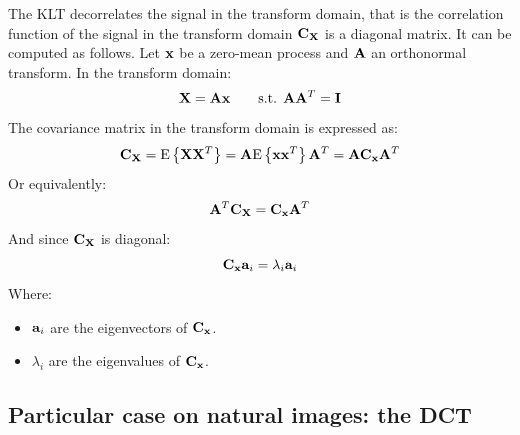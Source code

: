\documentclass[11pt,a4paper,openright,twoside]{book}
\numberwithin{equation}{section} %
\numberwithin{figure}{section} %
\numberwithin{table}{section} %
\begin{document}
The \ac{KLT} decorrelates the signal in the transform domain, that is the
correlation function of the signal in the transform domain $\mathbf{C}_{\mathbf{X}}$ is a
diagonal matrix.
It can be computed as follows.
Let $\mathbf{x}$ be a zero-mean process and $\mathbf{A}$ an orthonormal transform.
In the transform domain:
\begin{equation}
	\mathbf{X} = \mathbf{A} \mathbf{x} \qquad \text{s.t. } \mathbf{A} \mathbf{A}^T = \mathbf{I}
\end{equation}
The covariance matrix in the transform domain is expressed as:
\begin{equation}
	\mathbf{C}_{\mathbf{X}} = \text{E}\left\{\mathbf{X} \mathbf{X}^T\right\} = \mathbf{A} \text{E}\left\{\mathbf{x}\mathbf{x}^T\right\}\mathbf{A}^T =
	\mathbf{A}\mathbf{C}_{\mathbf{x}}\mathbf{A}^T
\end{equation}
Or equivalently:
\begin{equation}
	\mathbf{A}^T\mathbf{C}_{\mathbf{X}} = \mathbf{C}_{\mathbf{x}}\mathbf{A}^T
\end{equation}
And since $\mathbf{C}_{\mathbf{X}}$ is diagonal:
\begin{equation}
	\mathbf{C}_{\mathbf{x}} \mathbf{a}_i = \lambda_i\mathbf{a}_i
\end{equation}
Where:
\begin{itemize}
	\item $\mathbf{a}_i$ are the eigenvectors of $\mathbf{C}_{\mathbf{x}}$.
	\item $\lambda_i$ are the eigenvalues of $\mathbf{C}_{\mathbf{x}}$.
\end{itemize}

\subsection{Particular case on natural images: the \acs{DCT}}
\label{sub:particular_case_dct}
\end{document}
